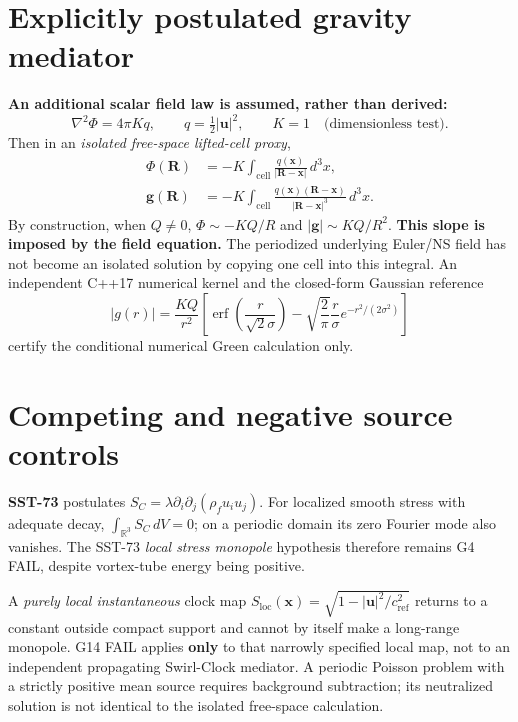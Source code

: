 \documentclass[10pt,a4paper]{article}
\begin{document}
\section{Explicitly postulated gravity mediator}
\textbf{An additional scalar field law is assumed, rather than derived:}
\begin{equation}
\nabla^2\Phi=4\pi K q,\qquad q=\tfrac12|\mathbf u|^2,\qquad K=1\quad\text{(dimensionless test)}.
\end{equation}
Then in an \emph{isolated free-space lifted-cell proxy},
\begin{align}
\Phi(\mathbf R)&=-K\int_{\mathrm{cell}}\frac{q(\mathbf x)}{|\mathbf R-\mathbf x|}\,d^3x,\\
\mathbf g(\mathbf R)&=-K\int_{\mathrm{cell}}\frac{q(\mathbf x)(\mathbf R-\mathbf x)}{|\mathbf R-\mathbf x|^3}\,d^3x.
\end{align}
By construction, when $Q\ne0$, $\Phi\sim-KQ/R$ and $|\mathbf g|\sim KQ/R^2$. \textbf{This slope is imposed by the field equation.} The periodized underlying Euler/NS field has not become an isolated solution by copying one cell into this integral. An independent C++17 numerical kernel and the closed-form Gaussian reference
\begin{equation}
|g(r)|=\frac{KQ}{r^2}\left[\operatorname{erf}\left(\frac{r}{\sqrt2\sigma}\right)
-\sqrt{\frac2\pi}\frac r\sigma e^{-r^2/(2\sigma^2)}\right]
\end{equation}
certify the conditional numerical Green calculation only.
\section{Competing and negative source controls}
\textbf{SST-73} postulates $S_C=\lambda\partial_i\partial_j(\rho_f u_i u_j)$. For localized smooth stress with adequate decay, $\int_{\mathbb{R}^3} S_C\,dV=0$; on a periodic domain its zero Fourier mode also vanishes. The SST-73 \emph{local stress monopole} hypothesis therefore remains G4 FAIL, despite vortex-tube energy being positive.

A \emph{purely local instantaneous} clock map $S_{\mathrm{loc}}(\mathbf{x})=\sqrt{1-|\mathbf u|^2/c_{\mathrm{ref}}^2}$ returns to a constant outside compact support and cannot by itself make a long-range monopole. G14 FAIL applies \textbf{only} to that narrowly specified local map, not to an independent propagating Swirl-Clock mediator. A periodic Poisson problem with a strictly positive mean source requires background subtraction; its neutralized solution is not identical to the isolated free-space calculation.
\end{document}
